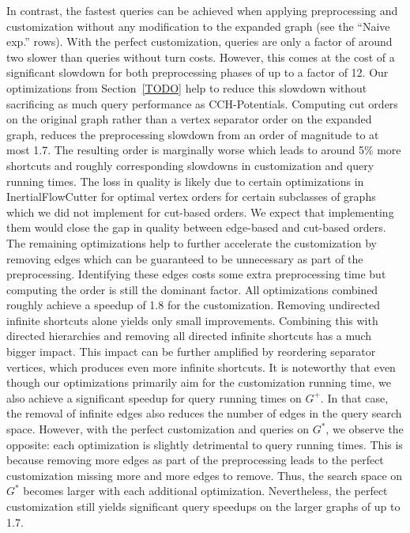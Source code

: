 \documentclass[a4paper, english, cleveref]{lipics-v2021}
\begin{document}
In contrast, the fastest queries can be achieved when applying preprocessing and customization without any modification to the expanded graph (see the ``Naive exp.'' rows).
With the perfect customization, queries are only a factor of around two slower than queries without turn costs.
However, this comes at the cost of a significant slowdown for both preprocessing phases of up to a factor of 12.
Our optimizations from Section~\ref{TODO} help to reduce this slowdown without sacrificing as much query performance as CCH-Potentials.
Computing cut orders on the original graph rather than a vertex separator order on the expanded graph, reduces the preprocessing slowdown from an order of magnitude to at most 1.7.
The resulting order is marginally worse which leads to around 5\% more shortcuts and roughly corresponding slowdowns in customization and query running times.
The loss in quality is likely due to certain optimizations in InertialFlowCutter for optimal vertex orders for certain subclasses of graphs which we did not implement for cut-based orders.
We expect that implementing them would close the gap in quality between edge-based and cut-based orders.
The remaining optimizations help to further accelerate the customization by removing edges which can be guaranteed to be unnecessary as part of the preprocessing.
Identifying these edges costs some extra preprocessing time but computing the order is still the dominant factor.
All optimizations combined roughly achieve a speedup of 1.8 for the customization.
Removing undirected infinite shortcuts alone yields only small improvements.
Combining this with directed hierarchies and removing all directed infinite shortcuts has a much bigger impact.
This impact can be further amplified by reordering separator vertices, which produces even more infinite shortcuts.
It is noteworthy that even though our optimizations primarily aim for the customization running time, we also achieve a significant speedup for query running times on $G^+$.
In that case, the removal of infinite edges also reduces the number of edges in the query search space.
However, with the perfect customization and queries on $G^*$, we observe the opposite:
each optimization is slightly detrimental to query running times.
This is because removing more edges as part of the preprocessing leads to the perfect customization missing more and more edges to remove.
Thus, the search space on $G^*$ becomes larger with each additional optimization.
Nevertheless, the perfect customization still yields significant query speedups on the larger graphs of up to 1.7.
\end{document}
